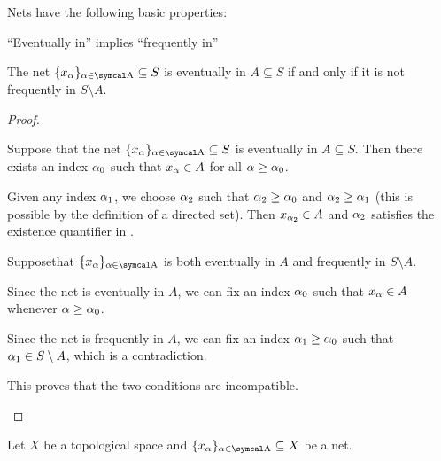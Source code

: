 \begin{proposition}\label{thm:topological_net_properties}
  Nets have the following basic properties:

  \begin{propenum}
     \enquote{Eventually in} implies \enquote{frequently in}

     The net \( \{ x_\al \}_{\al \in \CA} \subseteq S \) is eventually in \( A \subseteq S \) if and only if it is not frequently in \( S \setminus A \).
  \end{propenum}
\begin{proof}\mbox{}
  \begin{description}
     Suppose that the net \( \{ x_\al \}_{\al \in \CA} \subseteq S \) is eventually in \( A \subseteq S \). Then there exists an index \( \alpha_0 \) such that \( x_\alpha \in A \) for all \( \alpha \geq \alpha_0 \).

    Given any index \( \alpha_1 \), we choose \( \alpha_2 \) such that \( \alpha_2 \geq \alpha_0 \) and \( \alpha_2 \geq \alpha_1 \) (this is possible by the definition of a directed set). Then \( x_{\alpha_2} \in A \) and \( \alpha_2 \) satisfies the existence quantifier in .

     Suppose\LEM that \( \{ x_\al \}_{\al \in \CA} \) is both eventually in \( A \) and frequently in \( S \setminus A \).

    Since the net is eventually in \( A \), we can fix an index \( \alpha_0 \) such that \( x_\alpha \in A \) whenever \( \alpha \geq \alpha_0 \).

    Since the net is frequently in \( A \), we can fix an index \( \alpha_1 \geq \alpha_0 \) such that \( \alpha_1 \in S \setminus A \), which is a contradiction.

    This proves that the two conditions are incompatible.
  \end{description}
\end{proof}

\begin{definition}\label{def:net_convergence}
  Let \( X \) be a topological space and \( \{ x_\al \}_{\al \in \CA} \subseteq X \) be a net.


\end{definition}
\end{proposition}
